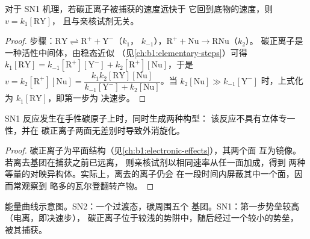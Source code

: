 \begin{proposition}[SN1 的速率方程]\label{prop:b1:nucleophilic-substitution:sn1-law}
对于 SN1 机理，若碳正离子被捕获的速度远快于
它回到底物的速度，则 $v = k_1[\mathrm{RY}]$，
且与亲核试剂无关。
\end{proposition}

\begin{proof}
步骤：$\mathrm{RY} \rightleftharpoons \mathrm{R^+} + \mathrm{Y^-}$（$k_1$，
$k_{-1}$），$\mathrm{R^+} + \mathrm{Nu} \to \mathrm{RNu}$（$k_2$）。
碳正离子是一种活性中间体，由稳态近似
（见\cref{ch:b1:elementary-steps}）可得 $k_1[\mathrm{RY}] =
k_{-1}[\mathrm{R^+}][\mathrm{Y^-}] + k_2[\mathrm{R^+}][\mathrm{Nu}]$，于是
$v = k_2[\mathrm{R^+}][\mathrm{Nu}] = \dfrac{k_1k_2[\mathrm{RY}][\mathrm{Nu}]}
{k_{-1}[\mathrm{Y^-}] + k_2[\mathrm{Nu}]}$。当 $k_2[\mathrm{Nu}] \gg
k_{-1}[\mathrm{Y^-}]$ 时，上式化为 $k_1[\mathrm{RY}]$，即第一步为
决速步。
\end{proof}

\begin{proposition}[SN1 的立体化学]\label{prop:b1:nucleophilic-substitution:sn1-stereo}
SN1 反应发生在手性碳原子上时，同时生成两种构型：
该反应不具有立体专一性，并在
碳正离子两面无差别时导致外消旋化。
\end{proposition}

\begin{proof}
碳正离子为平面结构（见\cref{ch:b1:electronic-effects}），其两个面
互为镜像。若离去基团在捕获之前已远离，
则亲核试剂以相同速率从任一面加成，得到
两种等量的对映异构体。实际上，离去的离子仍会
在一段时间内屏蔽其中一个面，因而常观察到
略多的瓦尔登翻转产物。
\end{proof}

\begin{omfigure}

{\small 能量曲线示意图。SN2：一个过渡态，碳周围五个
基团。SN1：第一步势垒较高（电离，即决速步），
碳正离子位于较浅的势阱中，随后经过一个较小的势垒，
被其捕获。}
\end{omfigure}

